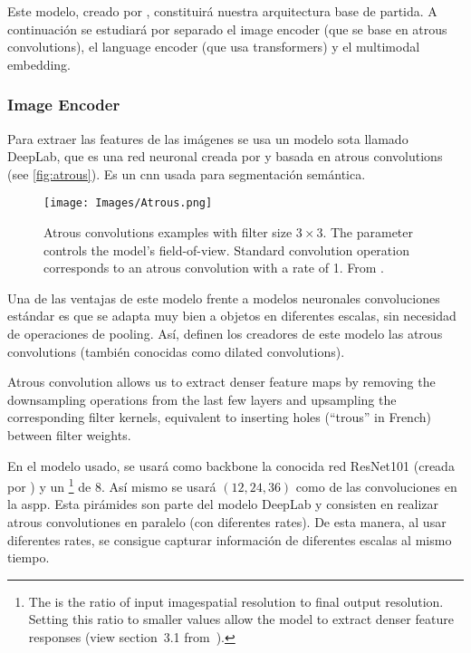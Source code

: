 Este modelo, creado por , constituirá nuestra
arquitectura base de partida. A continuación se estudiará por separado el image
encoder (que se base en atrous convolutions), el language encoder (que usa
transformers) y el multimodal embedding.

\subsubsection{Image Encoder}
Para extraer las features de las imágenes se usa un modelo \gls{sota} llamado
DeepLab, que es una red neuronal creada por  y basada en
atrous convolutions (see \vref{fig:atrous}). Es un \gls{cnn} usada para
segmentación semántica.

\begin{figure}[ht]
  \centering
  \texttt{[image: Images/Atrous.png]}
  \caption[Atrous convolutions examples]{Atrous convolutions examples with
    filter size \(3 \times 3\). The  parameter controls the model's
    field-of-view. Standard convolution operation corresponds to an atrous
    convolution with a rate of 1. From
    .}\label{fig:atrous}
\end{figure}

Una de las ventajas de este modelo frente a modelos neuronales convoluciones
estándar es que se adapta muy bien a objetos en diferentes escalas, sin
necesidad de operaciones de pooling. Así, definen los creadores de este modelo
las atrous convolutions (también conocidas como dilated convolutions).

\begin{quoteBox}
  Atrous convolution allows us to extract denser feature maps by removing the
  downsampling operations from the last few layers and upsampling the
  corresponding filter kernels, equivalent to inserting holes (``trous'' in
  French) between filter weights.
  \tcblower{}
\end{quoteBox}

En el modelo usado, se usará como backbone la conocida red ResNet101 (creada
por ) y un \footnote{The
   is the ratio of input imagespatial resolution to final
  output resolution. Setting this ratio to smaller values allow the model to
  extract denser feature responses (view section~3.1
  from~\cite{chen17:rethin}).} de 8. Así mismo se usará \((12, 24, 36)\) como
 de las convoluciones en la \gls{aspp}. Esta pirámides son parte
del modelo DeepLab y consisten en realizar atrous convolutiones en paralelo
(con diferentes rates). De esta manera, al usar diferentes rates, se consigue
capturar información de diferentes escalas al mismo tiempo.

